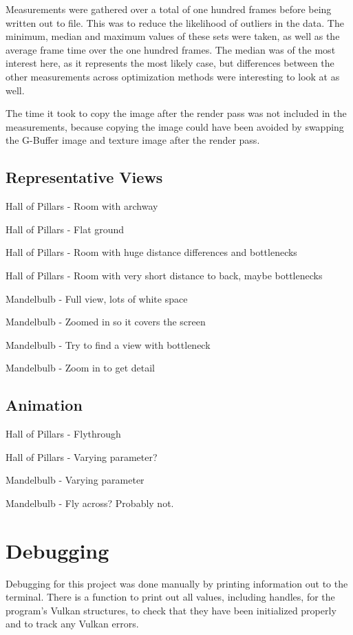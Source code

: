 Measurements were gathered over a total of one hundred frames before being written out to file. This was to reduce the likelihood of outliers in the data. The minimum, median and maximum values of these sets were taken, as well as the average frame time over the one hundred frames. The median was of the most interest here, as it represents the most likely case, but differences between the other measurements across optimization methods were interesting to look at as well.\newline

The time it took to copy the image after the render pass was not included in the measurements, because copying the image could have been avoided by swapping the G-Buffer image and texture image after the render pass.

\subsection{Representative Views}

Hall of Pillars - Room with archway

Hall of Pillars - Flat ground

Hall of Pillars - Room with huge distance differences and bottlenecks

Hall of Pillars - Room with very short distance to back, maybe bottlenecks

Mandelbulb - Full view, lots of white space

Mandelbulb - Zoomed in so it covers the screen

Mandelbulb - Try to find a view with bottleneck

Mandelbulb - Zoom in to get detail

\subsection{Animation}

Hall of Pillars - Flythrough

Hall of Pillars - Varying parameter?

Mandelbulb - Varying parameter

Mandelbulb - Fly across? Probably not.

\section{Debugging}

Debugging for this project was done manually by printing information out to the terminal. There is a function to print out all values, including handles, for the program's Vulkan structures, to check that they have been initialized properly and to track any Vulkan errors.\newline

